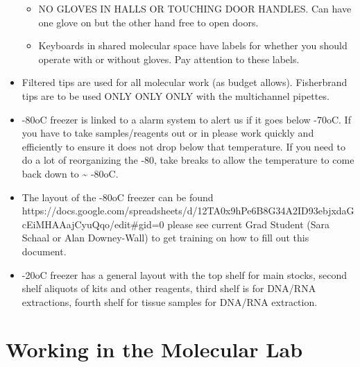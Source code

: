 \documentclass[
  letterpaper,
  DIV=11,
  numbers=noendperiod]{scrreprt}
\begin{document}
\begin{itemize}
  \begin{itemize}
  \item
    NO GLOVES IN HALLS OR TOUCHING DOOR HANDLES. Can have one glove on
    but the other hand free to open doors.
  \item
    Keyboards in shared molecular space have labels for whether you
    should operate with or without gloves. Pay attention to these
    labels.
  \end{itemize}
\item
  Filtered tips are used for all molecular work (as budget allows).
  Fisherbrand tips are to be used ONLY ONLY ONLY with the multichannel
  pipettes.
\item
  -80oC freezer is linked to a alarm system to alert us if it goes below
  -70oC. If you have to take samples/reagents out or in please work
  quickly and efficiently to ensure it does not drop below that
  temperature. If you need to do a lot of reorganizing the -80, take
  breaks to allow the temperature to come back down to \textasciitilde{}
  -80oC.
\item
  The layout of the -80oC freezer can be found
  https://docs.google.com/spreadsheets/d/12TA0x9hPe6B8G34A2ID93ebjxdaGcEiMHAAajCyuQqo/edit\#gid=0
  please see current Grad Student (Sara Schaal or Alan Downey-Wall) to
  get training on how to fill out this document.
\item
  -20oC freezer has a general layout with the top shelf for main stocks,
  second shelf aliquots of kits and other reagents, third shelf is for
  DNA/RNA extractions, fourth shelf for tissue samples for DNA/RNA
  extraction.
\end{itemize}

\hypertarget{working-in-the-molecular-lab}{%
\section*{\texorpdfstring{\textbf{Working in the Molecular
Lab}}{Working in the Molecular Lab}}\label{working-in-the-molecular-lab}}

\end{document}

